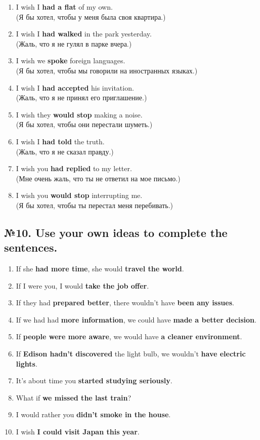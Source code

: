 \begin{enumerate}
      \item I wish I \textbf{had a flat} of my own. \\ (Я бы хотел, чтобы у меня была своя квартира.)
      \item I wish I \textbf{had walked} in the park yesterday. \\ (Жаль, что я не гулял в парке вчера.)
      \item I wish we \textbf{spoke} foreign languages. \\ (Я бы хотел, чтобы мы говорили на иностранных языках.)
      \item I wish I \textbf{had accepted} his invitation. \\ (Жаль, что я не принял его приглашение.)
      \item I wish they \textbf{would stop} making a noise. \\ (Я бы хотел, чтобы они перестали шуметь.)
      \item I wish I \textbf{had told} the truth. \\ (Жаль, что я не сказал правду.)
      \item I wish you \textbf{had replied} to my letter. \\ (Мне очень жаль, что ты не ответил на мое письмо.)
      \item I wish you \textbf{would stop} interrupting me. \\ (Я бы хотел, чтобы ты перестал меня перебивать.)
\end{enumerate}

\subsection*{№10. Use your own ideas to complete the sentences.}

\begin{enumerate}
      \item If she \textbf{had more time}, she would \textbf{travel the world}.
      \item If I were you, I would \textbf{take the job offer}.
      \item If they had \textbf{prepared better}, there wouldn't have \textbf{been any issues}.
      \item If we had had \textbf{more information}, we could have \textbf{made a better decision}.
      \item If \textbf{people were more aware}, we would have \textbf{a cleaner environment}.
      \item If \textbf{Edison hadn't discovered} the light bulb, we wouldn't \textbf{have electric lights}.
      \item It’s about time you \textbf{started studying seriously}.
      \item What if \textbf{we missed the last train}?
      \item I would rather you \textbf{didn't smoke in the house}.
      \item I wish \textbf{I could visit Japan this year}.
\end{enumerate}

